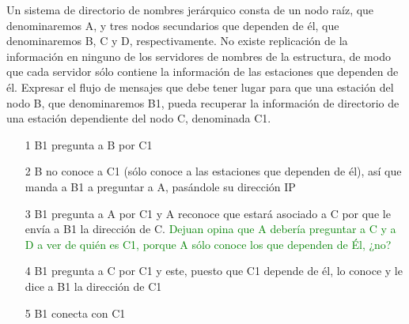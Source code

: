   \begin{problem}[10]
  Un sistema de directorio de nombres jerárquico consta de un nodo raíz, que
denominaremos A, y tres nodos secundarios que dependen de él, que denominaremos
B, C y D, respectivamente. No existe replicación de la información en ninguno
de los servidores de nombres de la estructura, de modo que cada servidor sólo
contiene la información de las estaciones que dependen de él. Expresar el flujo
de mensajes que debe tener lugar para que una estación del nodo B, que
denominaremos B1, pueda recuperar la información de directorio de una estación
dependiente del nodo C, denominada C1.
  \solution

  \yoP

  \begin{enumerate}
  \item[1] B1 pregunta a B por C1
  \item[2] B no conoce a C1 (sólo conoce a las estaciones que dependen de él), así que manda a B1 a preguntar a A, pasándole su dirección IP
  \item[3] B1 pregunta a A por C1 y A reconoce que estará asociado a C por que le envía a B1 la dirección de C. \textcolor{green}{Dejuan opina que A debería preguntar a C y a D a ver de quién es C1, porque A sólo conoce los que dependen de Él, ¿no?}
  \item[4] B1 pregunta a C por C1 y este, puesto que C1 depende de él, lo conoce y le dice a B1 la dirección de C1
  \item[5] B1 conecta con C1
  \end{enumerate}

  \end{problem}

